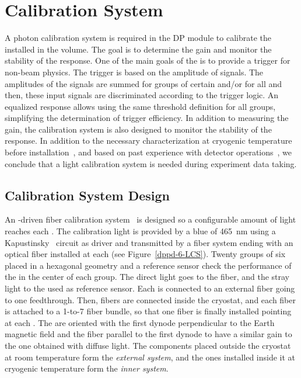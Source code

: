 \section{Calibration System}
\label{sec:dp-pds-calibration}

A photon calibration system is required in the DP module to calibrate the  installed in the  volume. The goal is to determine the  gain and monitor the stability of the  response. One of the main goals of the  is to provide a trigger for non-beam physics. The trigger is based on the amplitude of  signals. The amplitudes of the  signals are summed for groups of certain  and/or for all  and then, these input signals are discriminated according to the trigger logic. An equalized  response allows using the same threshold definition for all  groups, simplifying the determination of trigger efficiency. In addition to measuring the  gain, the calibration system is also designed to monitor the stability of the  response. %
In addition to the necessary  characterization at cryogenic temperature before installation~\cite{Belver:2018erf}, and based on past experience with  detector operations~\cite{Aimard:2018yxp}, we conclude that a light calibration system is needed during experiment data taking.


\subsection{Calibration System Design}

An -driven fiber calibration system~\cite{Cuesta:2017nrs,Conrad:2015xta,Caccianiga:2003fm,ADAMSON2002325,Belver:2019lqm} is designed so a configurable amount of light reaches each . The calibration light is provided by a blue  of \SI{465}{\nm} using a Kapustinsky~\cite{KAPUSTINSKY1985612} circuit as  driver and transmitted by a fiber system ending with an optical fiber installed at each  (see Figure~\ref{dppd-6-LCS}). Twenty groups of six  placed in a hexagonal geometry and a reference sensor check the performance of the  in the center of each group. The direct light goes to the fiber, and the stray light to the  used as reference sensor. Each  is connected to an external fiber going to one feedthrough. Then, fibers are connected inside the cryostat, and each fiber is attached to a 1-to-7 fiber bundle, so that one fiber is finally installed pointing at each . The  are oriented with the first dynode perpendicular to the Earth magnetic field and the fiber parallel to the first dynode to have a similar gain to the one obtained with diffuse light. The components placed outside the cryostat at room temperature form the \textit{external system}, and the ones installed inside it at cryogenic temperature form the \textit{inner system}. 


